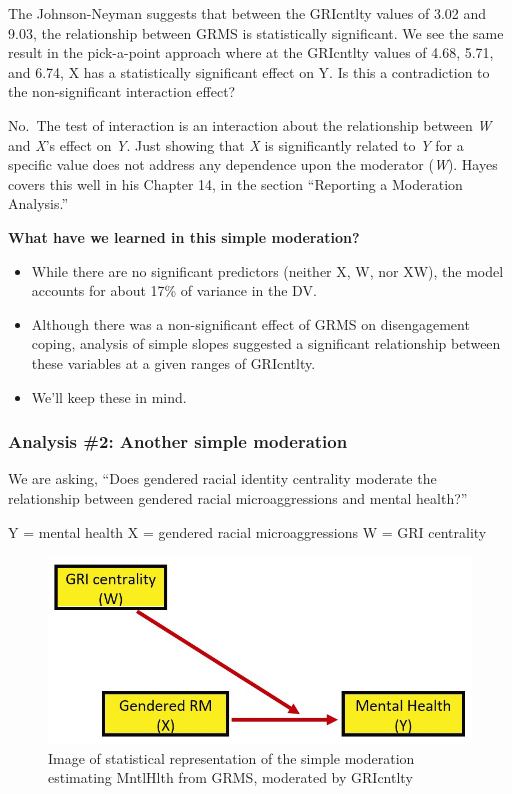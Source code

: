 \documentclass[
  11pt,
]{book}
\providecommand{\tightlist}{%
  \setlength{\itemsep}{0pt}\setlength{\parskip}{0pt}}
\begin{document}
The Johnson-Neyman suggests that between the GRIcntlty values of 3.02 and 9.03, the relationship between GRMS is statistically significant. We see the same result in the pick-a-point approach where at the GRIcntlty values of 4.68, 5.71, and 6.74, X has a statistically significant effect on Y. Is this a contradiction to the non-significant interaction effect?

No.~The test of interaction is an interaction about the relationship between \emph{W} and \emph{X}'s effect on \emph{Y}. Just showing that \emph{X} is significantly related to \emph{Y} for a specific value does not address any dependence upon the moderator (\emph{W}). Hayes \citeyearpar{hayes_introduction_2018} covers this well in his Chapter 14, in the section ``Reporting a Moderation Analysis.''

\textbf{What have we learned in this simple moderation?}

\begin{itemize}
\tightlist
\item
  While there are no significant predictors (neither X, W, nor XW), the model accounts for about 17\% of variance in the DV.
\item
  Although there was a non-significant effect of GRMS on disengagement coping, analysis of simple slopes suggested a significant relationship between these variables at a given ranges of GRIcntlty.
\item
  We'll keep these in mind.
\end{itemize}

\hypertarget{analysis-2-another-simple-moderation}{%
\subsubsection{Analysis \#2: Another simple moderation}\label{analysis-2-another-simple-moderation}}

We are asking, ``Does gendered racial identity centrality moderate the relationship between gendered racial microaggressions and mental health?''

Y = mental health
X = gendered racial microaggressions
W = GRI centrality

\begin{figure}
\centering
\includegraphics{images/ModMed/LewisMod2.jpg}
\caption{Image of statistical representation of the simple moderation estimating MntlHlth from GRMS, moderated by GRIcntlty}
\end{figure}
\end{document}
